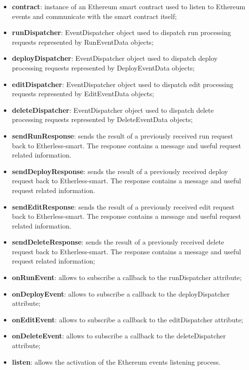 	\begin{itemize}
		\item \textbf{contract}: instance of an Ethereum smart contract used to listen to Ethereum events and communicate with the smart contract itself;
		\item \textbf{runDispatcher}: EventDispatcher object used to dispatch run processing requests represented by RunEventData objects;
		\item \textbf{deployDispatcher}: EventDispatcher object used to dispatch deploy processing requests represented by DeployEventData objects;
		\item \textbf{editDispatcher}: EventDispatcher object used to dispatch edit processing requests represented by EditEventData objects;
		\item \textbf{deleteDispatcher}: EventDispatcher object used to dispatch delete processing requests represented by DeleteEventData objects;
	\end{itemize}
	\begin{itemize}
		\item \textbf{sendRunResponse}: sends the result of a previously received run request back to Etherless-smart. The response contains a message and useful request related information.
		\item \textbf{sendDeployResponse}: sends the result of a previously received deploy request back to Etherless-smart. The response contains a message and useful request related information.
		\item \textbf{sendEditResponse}: sends the result of a previously received edit request back to Etherless-smart. The response contains a message and useful request related information.
		\item \textbf{sendDeleteResponse}: sends the result of a previously received delete request back to Etherless-smart. The response contains a message and useful request related information;
		\item \textbf{onRunEvent}: allows to subscribe a callback to the runDispatcher attribute;
		\item \textbf{onDeployEvent}: allows to subscribe a callback to the deployDispatcher attribute;
		\item \textbf{onEditEvent}: allows to subscribe a callback to the editDispatcher attribute;
		\item \textbf{onDeleteEvent}: allows to subscribe a callback to the deleteDispatcher attribute;
		\item \textbf{listen}: allows the activation of the Ethereum events listening process.
	\end{itemize}

